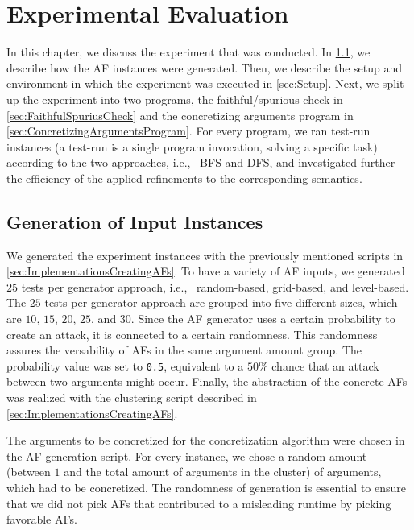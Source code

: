 \chapter{Experimental Evaluation}
\label{ch:experiment}
In this chapter, we discuss the experiment that was conducted. In \cref{sec:GenerationOfInputInstances}, we describe how the AF instances were generated. Then, we describe the setup and environment in which the experiment was executed in \cref{sec:Setup}. Next, we split up the experiment into two programs, the faithful/spurious check in \cref{sec:FaithfulSpuriusCheck} and the concretizing arguments program in \cref{sec:ConcretizingArgumentsProgram}. For every program, we ran test-run instances (a test-run is a single program invocation, solving a specific task) according to the two approaches, i.e., \ BFS and DFS, and investigated further the efficiency of the applied refinements to the corresponding semantics.


\section{Generation of Input Instances}
\label{sec:GenerationOfInputInstances}
We generated the experiment instances with the previously mentioned scripts in \cref{sec:ImplementationsCreatingAFs}. To have a variety of AF inputs, we generated $25$ tests per generator approach, i.e., \ random-based, grid-based, and level-based. The $25$ tests per generator approach are grouped into five different sizes, which are $10$, $15$, $20$, $25$, and $30$. Since the AF generator uses a certain probability to create an attack, it is connected to a certain randomness. This randomness assures the versability of AFs in the same argument amount group. The probability value was set to \texttt{0.5}, equivalent to a $50\%$ chance that an attack between two arguments might occur. Finally, the abstraction of the concrete AFs was realized with the clustering script described in \cref{sec:ImplementationsCreatingAFs}. 

The arguments to be concretized for the concretization algorithm were chosen in the AF generation script. For every instance, we chose a random amount (between $1$ and the total amount of arguments in the cluster) of arguments, which had to be concretized. The randomness of generation is essential to ensure that we did not pick AFs that contributed to a misleading runtime by picking favorable AFs.


